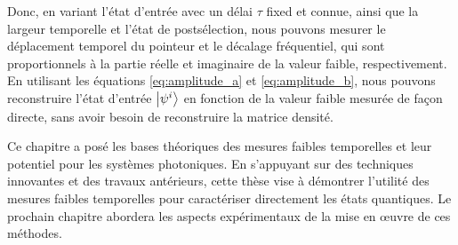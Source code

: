 \begin{onehalfspace}




    \noindent Donc, en variant l'état d'entrée avec un délai 
    $\tau$ fixed et connue, ainsi que la largeur temporelle et
    l'état de postsélection, nous pouvons mesurer le déplacement 
    temporel du pointeur et le décalage fréquentiel, qui sont 
    proportionnels à la partie réelle et imaginaire de la valeur faible, 
    respectivement. En utilisant les équations \ref{eq:amplitude_a} et 
    \ref{eq:amplitude_b}, nous pouvons reconstruire l'état d'entrée 
    $\ket{\psi^{i}}$ en fonction de la valeur faible mesurée de façon 
    directe, sans avoir besoin de reconstruire la matrice densité.
    
    

\end{onehalfspace}

    
\begin{onehalfspace}
    \noindent Ce chapitre a posé les bases théoriques des mesures faibles 
    temporelles et leur potentiel pour les systèmes photoniques. En 
    s’appuyant sur des techniques innovantes et des travaux antérieurs, 
    cette thèse vise à démontrer l’utilité des mesures faibles 
    temporelles pour caractériser directement les états quantiques. Le 
    prochain chapitre abordera les aspects expérimentaux de la mise en 
    œuvre de ces méthodes.
\end{onehalfspace}